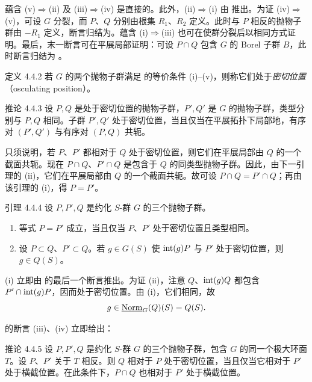 蕴含 (v)\(\Rightarrow\)(ii) 及 (iii)\(\Rightarrow\)(iv) 是直接的。此外，(ii)\(\Rightarrow\)(i) 由  推出。为证 (iv)\(\Rightarrow\)(v)，可设 \(G\) 分裂，而 \(P\)、\(Q\) 分别由根集 \(R_1\)、\(R_2\) 定义。此时与 \(P\) 相反的抛物子群由 \(-R_1\) 定义，断言归结为。蕴含 (i)\(\Rightarrow\)(iii) 也可在使群分裂后以相同方式证明。最后，末一断言可在平展局部证明：可设 \(P\cap Q\) 包含 \(G\) 的 Borel 子群 \(B\)，此时断言归结为 。

\begin{sgastatement}{定义 4.4.2}
若 \(G\) 的两个抛物子群满足  的等价条件 (i)--(v)，则称它们处于\emph{密切位置}（osculating position）。
\end{sgastatement}

\begin{sgastatement}{推论 4.4.3}
设 \(P,Q\) 是处于密切位置的抛物子群，\(P',Q'\) 是 \(G\) 的抛物子群，类型分别与 \(P,Q\) 相同。子群 \(P',Q'\) 处于密切位置，当且仅当在平展拓扑下局部地，有序对 \((P',Q')\) 与有序对 \((P,Q)\) 共轭。
\end{sgastatement}

只须说明，若 \(P\)、\(P'\) 都相对于 \(Q\) 处于密切位置，则它们在平展局部由 \(Q\) 的一个截面共轭。现在 \(P\cap Q\)、\(P'\cap Q\) 是包含于 \(Q\) 的同类型抛物子群。因此，由下一引理的 (ii)，它们在平展局部由 \(Q\) 的一个截面共轭。故可设 \(P\cap Q=P'\cap Q\)；再由该引理的 (i)，得 \(P=P'\)。

\begin{sgastatement}{引理 4.4.4}
设 \(P,P',Q\) 是约化 \(S\)-群 \(G\) 的三个抛物子群。
\begin{enumerate}[label=\textup{(\roman*)}]
\item 等式 \(P=P'\) 成立，当且仅当 \(P\)、\(P'\) 处于密切位置且类型相同。
\item 设 \(P\subset Q\)、\(P'\subset Q\)。若 \(g\in G(S)\) 使 \(\operatorname{int}(g)P\) 与 \(P'\) 处于密切位置，则 \(g\in Q(S)\)。
\end{enumerate}
\end{sgastatement}

(i) 立即由  的最后一个断言推出。为证 (ii)，注意 \(Q\)、\(\operatorname{int}(g)Q\) 都包含 \(P'\cap\operatorname{int}(g)P\)，因而处于密切位置。由 (i)，它们相同，故
\[
 g\in\underline{\operatorname{Norm}}_G(Q)(S)=Q(S).
\]

 的断言 (iii)、(iv) 立即给出：
\begin{sgastatement}{推论 4.4.5}
设 \(P,P',Q\) 是约化 \(S\)-群 \(G\) 的三个抛物子群，包含 \(G\) 的同一个极大环面 \(T\)。设 \(P\)、\(P'\) 关于 \(T\) 相反。则 \(Q\) 相对于 \(P\) 处于密切位置，当且仅当它相对于 \(P'\) 处于横截位置。在此条件下，\(P\cap Q\) 也相对于 \(P'\) 处于横截位置。
\end{sgastatement}

